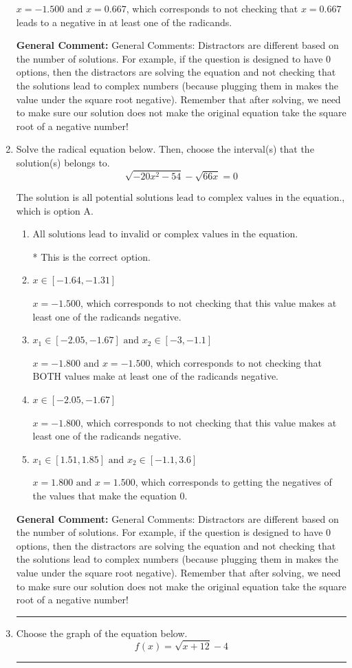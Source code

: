 \documentclass{extbook}[14pt]
\newcommand{\litem}[1]{\item #1

\rule{\textwidth}{0.4pt}}
\begin{document}
\begin{enumerate}
{\begin{enumerate}[label=\Alph*.]
$x = -1.500 \text{ and } x = 0.667$, which corresponds to not checking that $x = 0.667$ leads to a negative in at least one of the radicands.
\end{enumerate}

\textbf{General Comment:} General Comments: Distractors are different based on the number of solutions. For example, if the question is designed to have 0 options, then the distractors are solving the equation and not checking that the solutions lead to complex numbers (because plugging them in makes the value under the square root negative). Remember that after solving, we need to make sure our solution does not make the original equation take the square root of a negative number!
}
\litem{
Solve the radical equation below. Then, choose the interval(s) that the solution(s) belongs to.
\[ \sqrt{-20 x^2 - 54} - \sqrt{66 x} = 0 \]

The solution is \( \text{all potential solutions lead to complex values in the equation.} \), which is option A.\begin{enumerate}[label=\Alph*.]
\item \( \text{All solutions lead to invalid or complex values in the equation.} \)

* This is the correct option.
\item \( x \in [-1.64,-1.31] \)

$x = -1.500$, which corresponds to not checking that this value makes at least one of the radicands negative.
\item \( x_1 \in [-2.05, -1.67] \text{ and } x_2 \in [-3,-1.1] \)

$x = -1.800 \text{ and } x = -1.500$, which corresponds to not checking that BOTH values make at least one of the radicands negative.
\item \( x \in [-2.05,-1.67] \)

$x = -1.800$, which corresponds to not checking that this value makes at least one of the radicands negative.
\item \( x_1 \in [1.51, 1.85] \text{ and } x_2 \in [-1.1,3.6] \)

$x = 1.800 \text{ and } x = 1.500$, which corresponds to getting the negatives of the values that make the equation 0.
\end{enumerate}

\textbf{General Comment:} General Comments: Distractors are different based on the number of solutions. For example, if the question is designed to have 0 options, then the distractors are solving the equation and not checking that the solutions lead to complex numbers (because plugging them in makes the value under the square root negative). Remember that after solving, we need to make sure our solution does not make the original equation take the square root of a negative number!
}
\litem{
Choose the graph of the equation below.
\[ f(x) = \sqrt{x + 12} - 4 \]

}
\end{enumerate}
\end{document}
